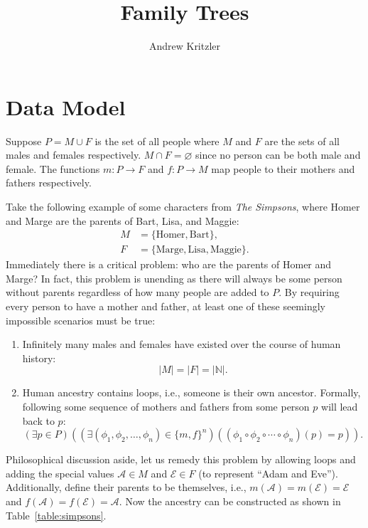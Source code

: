 \documentclass{article}
\title{Family Trees}
\author{Andrew Kritzler}
\begin{document}
\maketitle

\section{Data Model}

Suppose \(P = M \cup F\) is the set of all people where \(M\) and \(F\) are the sets of all males and females respectively.
\(M \cap F = \varnothing{}\) since no person can be both male and female.
The functions \(m : P \to F\) and \(f : P \to M\) map people to their mothers and fathers respectively.

Take the following example of some characters from \textit{The Simpsons}, where Homer and Marge are the parents of Bart, Lisa, and Maggie:
\[
    \begin{aligned}
        M & = \{\text{Homer}, \text{Bart}\},                \\
        F & = \{\text{Marge}, \text{Lisa}, \text{Maggie}\}.
    \end{aligned}
\]
Immediately there is a critical problem: who are the parents of Homer and Marge?
In fact, this problem is unending as there will always be some person without parents regardless of how many people are added to \(P\).
By requiring every person to have a mother and father, at least one of these seemingly impossible scenarios must be true:
\begin{enumerate}
    \item Infinitely many males and females have existed over the course of human history:
          \[
              |M| = |F| = |\mathbb{N}|.
          \]
    \item Human ancestry contains loops, i.e., someone is their own ancestor. Formally, following some sequence of mothers and fathers from some person \(p\) will lead back to \(p\):
          \[
              (\exists p \in P)
              (
              (\exists (\phi_1, \phi_2, \dotsc, \phi_n) \in {\{m, f\}}^n)
              ( (\phi_1 \circ \phi_2 \circ \cdots \circ \phi_n)(p) = p)
              ).
          \]
\end{enumerate}

Philosophical discussion aside, let us remedy this problem by allowing loops and adding the special values \(\mathcal{A} \in M\) and \(\mathcal{E} \in F\) (to represent ``Adam and Eve'').
Additionally, define their parents to be themselves, i.e., \(m(\mathcal{A}) = m(\mathcal{E}) = \mathcal{E}\) and \(f(\mathcal{A}) = f(\mathcal{E}) = \mathcal{A}\).
Now the ancestry can be constructed as shown in Table~\ref{table:simpsons}.
\end{document}

